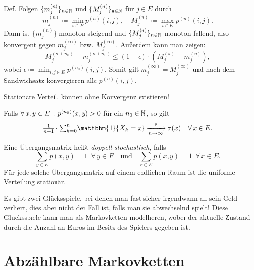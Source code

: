 \documentclass{cheat-sheet}
\renewcommand{\P}{\mathbb{P}} %
\newcommand{\ind}{\mathbbm{1}} %
\begin{document}
\begin{beweisidee}
  Def. Folgen $\{ m_j^{(n)} \}_{n \in \mathbb{N}}$ und $\{ M_j^{(n)} \}_{n \in \mathbb{N}}$ für $j \in E$ durch
  \[
    m_j^{(n)} \coloneqq {\min}_{i \in E} p^{(n)}(i, j), \quad
    M_j^{(n)} \coloneqq {\max}_{i \in E} p^{(n)}(i, j).
  \]
  Dann ist $\{ m_j^{(n)} \}$ monoton steigend und $\{ M_j^{(n)} \}_{n \in \mathbb{N}}$ monoton fallend, also konvergent gegen $m_j^{(\infty)}$ bzw. $M_j^{(\infty)}$.
  Außerdem kann man zeigen:
  \[
    M_j^{(n+n_0)} - m_j^{(n+n_0)} \leq (1-\epsilon) \cdot (M_j^{(n)} - m_j^{(n)}),
  \]
  wobei $\epsilon \coloneqq {\min}_{i, j \in E} p^{(n_0)}(i, j)$.
  Somit gilt $m_j^{(\infty)} = M_j^{(\infty)}$ und nach dem Sandwichsatz konvergieren alle $p^{(n)}(i, j)$.
\end{beweisidee}

\begin{acht}
  Stationäre Verteil. können ohne Konvergenz existieren!
\end{acht}

\begin{satz}
  Falls $\forall \, {x, y \in E} \,:\, p^{(n_0)}(x, y) > 0$ für ein $n_0 \in \mathbb{N}$, so gilt
  \[
    \tfrac{1}{n+1} \cdot {\sum}_{k=0}^n \ind \{ X_k = x \} \xrightarrow[n \to \infty]{\P} \pi(x)
    \quad \forall \, x \in E.
  \]
\end{satz}

\begin{bem}
  Eine Übergangsmatrix heißt \emph{doppelt stochastisch}, falls
  \[
    {\sum}_{y \in E} p(x, y) = 1 \enspace \forall \, y \in E
    \quad \text{und} \quad
    {\sum}_{x \in E} p(x, y) = 1 \enspace \forall \, x \in E.
  \]
  Für jede solche Übergangsmatrix auf einem endlichen Raum ist die uniforme Verteilung stationär.
\end{bem}

\begin{samepage}


\begin{bem}
  Es gibt zwei Glücksspiele, bei denen man fast-sicher irgendwann all sein Geld verliert, dies aber nicht der Fall ist, falls man sie abwechselnd spielt!
  Diese Glücksspiele kann man als Markovketten modellieren, wobei der aktuelle Zustand durch die Anzahl an Euros im Besitz des Spielers gegeben ist.
\end{bem}


\section{Abzählbare Markovketten}

\end{samepage}
\end{document}
